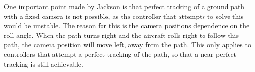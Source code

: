 One important point made by Jackson is that perfect tracking of a ground path with a fixed camera is not possible, as the controller that attempts to solve this would be unstable. The reason for this is the camera positions dependence on the roll angle. When the path turns right and the aircraft rolls right to follow this path, the camera position will move left, away from the path. This only applies to controllers that attempt a perfect tracking of the path, so that a near-perfect tracking is still achievable.